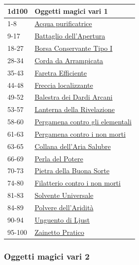 \begin{multicols}{2}
{{\small\begin{tabularx}{0.45\textwidth}{lX}
		\toprule
\textbf{1d100} & \textbf{Oggetti magici vari 1}\\
\toprule
1-8 & \hyperlink{Acquapurificatrice}{Acqua purificatrice}\\
9-17 & \hyperlink{Battagliodell'Apertura}{Battaglio dell'Apertura}\\
18-27 & \hyperlink{BorsaConservanteTipoI}{Borsa Conservante Tipo I}\\
28-34 & \hyperlink{CordadaArrampicata}{Corda da Arrampicata}\\
35-43 & \hyperlink{FaretraEfficiente}{Faretra Efficiente}\\
44-48 & \hyperlink{Freccialocalizzante}{Freccia localizzante}\\
49-52 & \hyperlink{BalestradeiDardiArcani}{Balestra dei Dardi Arcani}\\
53-57 & \hyperlink{LanternadellaRivelazione}{Lanterna della Rivelazione}\\
58-60 & \hyperlink{Pergamenacontroglielementali}{Pergamena contro gli elementali}\\
61-63 & \hyperlink{Pergamenacontroinonmorti}{Pergamena contro i non morti}\\
63-65 & \hyperlink{Collanadell'AriaSalubre}{Collana dell'Aria Salubre}\\
66-69 & \hyperlink{PerladelPotere}{Perla del Potere}\\
70-73 & \hyperlink{PietradellaBuonaSorte}{Pietra della Buona Sorte}\\
74-80 & \hyperlink{Filatteriocontroinonmorti}{Filatterio contro i non morti}\\
81-83 & \hyperlink{SolventeUniversale}{Solvente Universale}\\
84-89 & \hyperlink{Polveredell'Aridità}{Polvere dell'Aridità}\\
90-94 & \hyperlink{UnguentodiLjust}{Unguento di Ljust}\\
95-100 & \hyperlink{ZainettoPratico}{Zainetto Pratico}
\end{tabularx}}

\subsubsection{Oggetti magici vari 2}\hypertarget{Oggetti Magici Vari 2}{}

}
\end{multicols}
